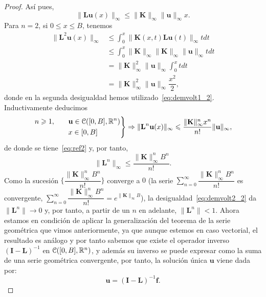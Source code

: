 \begin{proof}
	Así pues,
	\begin{equation}\label{eq:demvolt1_2}
		\lVert \textbf{L}\textbf{u}(x)\rVert_\infty \leqslant \lVert \textbf{K} \rVert_\infty \lVert \textbf{u} \rVert_\infty x.
	\end{equation}
	Para $n = 2$, si $0 \leqslant x \leqslant B$, tenemos
	\begin{equation}
		\begin{split}
			\lVert \textbf{L}^2\textbf{u}(x)\rVert_\infty & \leqslant \int_{0}^{x}\lVert \textbf{K}(x,t)\textbf{L}\textbf{u}(t)\rVert_\infty tdt \\
			& \leqslant \int_{0}^{x} \lVert \textbf{K} \rVert_\infty \lVert \textbf{K} \rVert_\infty \lVert \textbf{u} \rVert_\infty tdt\\
			& =  \lVert \textbf{K} \rVert_\infty^2 \lVert \textbf{u} \rVert_\infty \int_{0}^{x}tdt \\
			& = \lVert \textbf{K} \rVert_\infty^2 \lVert \textbf{u} \rVert_\infty \dfrac{x^2}{2},
		\end{split}
	\end{equation}
	donde en la segunda desigualdad hemos utilizado~\eqref{eq:demvolt1_2}. Inductivamente deducimos
	\begin{equation}
		\left.\begin{split}
			n \geqslant 1, \qquad & \textbf{u} \in \mathcal{C}([0,B],\mathbb{R}^n)\\
			& x \in [0,B]
		\end{split}\right\rbrace \Rightarrow \lVert \textbf{L}^n\textbf{u}(x)\rVert_\infty \leqslant \dfrac{\lVert \textbf{K} \rVert_\infty^nx^n}{n!}\lVert \textbf{u} \rVert_\infty,
	\end{equation}
	de donde se tiene~\eqref{eq:ref2} y, por tanto,
	\begin{equation}\label{eq:demvolt2_2}
		\lVert \textbf{L}^n \rVert_\infty \leqslant \dfrac{\lVert \textbf{K} \rVert_\infty^nB^n}{n!}.
	\end{equation}
	Como la sucesión $\{\dfrac{\lVert \textbf{K} \rVert_\infty^nB^n}{n!}\}$ converge a $0$ (la serie $\displaystyle \sum_{n=0}^{\infty}\dfrac{\lVert \textbf{K} \rVert_\infty^nB^n}{n!}$ es convergente, $\displaystyle \sum_{n=0}^{\infty}\dfrac{\lVert \textbf{K} \rVert_\infty^nB^n}{n!} = e^{\lVert \textbf{K} \rVert_\infty B}$), la desigualdad~\eqref{eq:demvolt2_2} da $\lVert \textbf{L}^n \rVert \rightarrow 0$ y, por tanto, a partir de un $n$ en adelante, $\lVert \textbf{L}^n \rVert < 1$.
	Ahora estamos en condición de aplicar la generalización del teorema de la serie geométrica que vimos anteriormente, ya que aunque estemos en caso vectorial, el resultado es análogo y por tanto sabemos que existe el operador inverso $(\textbf{I}-\textbf{L})^{-1}$ en $\mathcal{C}([0,B],\mathbb{R}^n)$, y además su inverso se puede expresar como la suma de una serie geométrica convergente, por tanto, la solución única $\textbf{u}$ viene dada por:
	\begin{equation}
		\textbf{u} = (\textbf{I}-\textbf{L})^{-1}\textbf{f}.
	\end{equation}
\end{proof}
